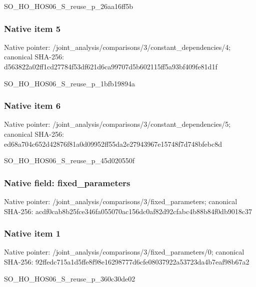 \documentclass[10pt,a4paper]{article}
\begin{document}
\begingroup\raggedright\sloppy SO\_\allowbreak{}HO\_\allowbreak{}HOS06\_\allowbreak{}S\_\allowbreak{}reuse\_\allowbreak{}p\_\allowbreak{}26aa16ff5b\par\endgroup

\subsubsection{Native item 5}
Native pointer: /joint\_\allowbreak{}analysis/comparisons/3/constant\_\allowbreak{}dependencies/4; canonical SHA-256: d563822a02ff1cd27784f53df621d6ca99707d5b602115ff5a93bf409fe81d1f

\begingroup\raggedright\sloppy SO\_\allowbreak{}HO\_\allowbreak{}HOS06\_\allowbreak{}S\_\allowbreak{}reuse\_\allowbreak{}p\_\allowbreak{}1bfb19894a\par\endgroup

\subsubsection{Native item 6}
Native pointer: /joint\_\allowbreak{}analysis/comparisons/3/constant\_\allowbreak{}dependencies/5; canonical SHA-256: ed68a704c652d42876f81a0d09952ff55da2e27943967e15748f7d748bfebc8d

\begingroup\raggedright\sloppy SO\_\allowbreak{}HO\_\allowbreak{}HOS06\_\allowbreak{}S\_\allowbreak{}reuse\_\allowbreak{}p\_\allowbreak{}45d020550f\par\endgroup

\subsubsection{Native field: fixed\_\allowbreak{}parameters}
Native pointer: /joint\_\allowbreak{}analysis/comparisons/3/fixed\_\allowbreak{}parameters; canonical SHA-256: acdf0cab8b25fce346fa055070ac156dc0af82d92cfabc4b88b84f0db9018c37

\subsubsection{Native item 1}
Native pointer: /joint\_\allowbreak{}analysis/comparisons/3/fixed\_\allowbreak{}parameters/0; canonical SHA-256: 92ffedc715a1d5ffe8f98e16298777d6cfe08037922a53723da4b7eaf98b67a2

\begingroup\raggedright\sloppy SO\_\allowbreak{}HO\_\allowbreak{}HOS06\_\allowbreak{}S\_\allowbreak{}reuse\_\allowbreak{}p\_\allowbreak{}360c30de02\par\endgroup
\end{document}
